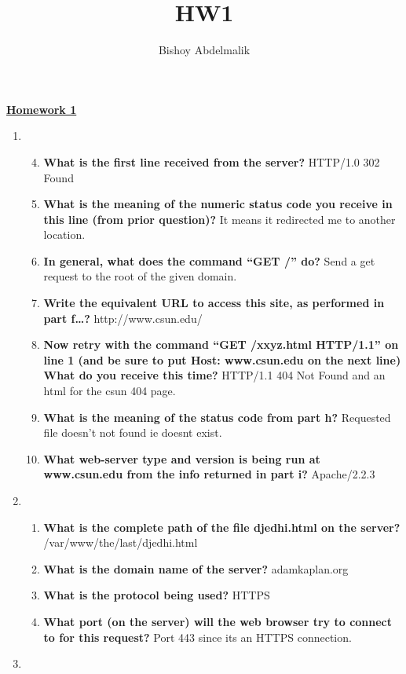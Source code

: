 \documentclass{article}
\title{HW1}
\author{Bishoy Abdelmalik}
\begin{document}
\begin{center}
    \underline{\textbf{Homework 1}}
\end{center}    
\begin{enumerate}
    \item \begin{enumerate} \setcounter{enumii}{3}
        \item \textbf{What is the first line received from the server? } \newline HTTP/1.0 302 Found
        \item \textbf{What is the meaning of the numeric status code you receive in this line (from prior 
        question)?} \newline It means it redirected me to another location.
        \item \textbf{In general, what does the command “GET /” do? } \newline Send a get request to the root of the given domain.
        \item \textbf{Write the equivalent URL to access this site, as performed in part f…? } \newline http://www.csun.edu/
        \item \textbf{Now retry with the command “GET /xxyz.html HTTP/1.1” on line 1 (and be sure to 
        put Host: www.csun.edu on the next line) What do you receive this time?} \newline HTTP/1.1 404 Not Found and an html for the csun 404 page.
        \item \textbf{What is the meaning of the status code from part h?} \newline Requested file doesn't not found ie doesnt exist.
        \item \textbf{What web-server type and version is being run at www.csun.edu from the info 
        returned in part i?} \newline Apache/2.2.3         
    \end{enumerate}
    \item \begin{enumerate}
        \item \textbf{What is the complete path of the file djedhi.html on the server?} \newline /var/www/the/last/djedhi.html
        \item \textbf{What is the domain name of the server?} \newline adamkaplan.org
        \item \textbf{What is the protocol being used?} \newline HTTPS
        \item \textbf{What port (on the server) will the web browser try to connect to for this request?} \newline Port 443 since its an HTTPS connection. 
    \end{enumerate}
    \item 
\end{enumerate}
\end{document}
